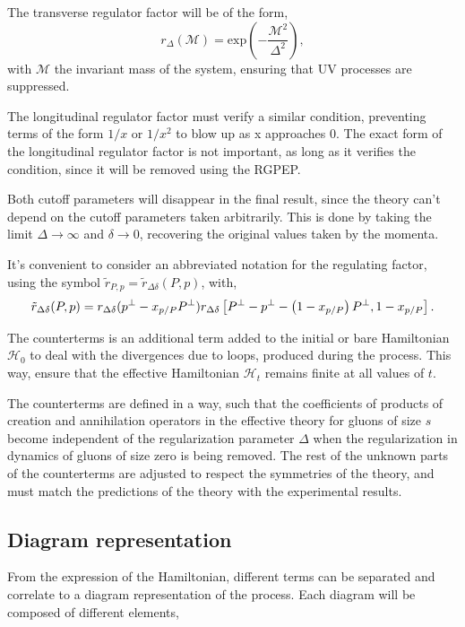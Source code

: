 \documentclass[11pt,a4paper,twoside,pdf]{article}
\numberwithin{equation}{section}
\begin{document}
The transverse regulator factor will be of the form, 
\begin{equation}
    r_\Delta (\mathcal{M}) = \text{exp} \left( -\frac{\mathcal{M}^2}{\Delta^2} \right),
\end{equation}
with $\mathcal{M}$ the invariant mass of the system, ensuring that UV processes are
suppressed.

The longitudinal regulator factor must verify a similar condition, preventing terms
of the form $1/x$ or $1/x^2$ to blow up as x approaches 0. The exact form of the 
longitudinal regulator factor is not important, as long as it verifies the condition, 
since it will be removed using the RGPEP.

Both cutoff parameters will disappear in the final result, since the theory can't
depend on the cutoff parameters taken arbitrarily. This is done by taking the
limit $\Delta \to \infty$ and $\delta \to 0$, recovering the original values
taken by the momenta.

It's convenient to consider an abbreviated notation for the regulating factor, 
using the symbol $\tilde{r}_{P, p} = \tilde{r}_{\Delta \delta} (P,p)$, with,
\begin{equation}
    \tilde{r}_{\Delta \delta} (P,p) = r_{\Delta \delta} (p^\perp - x_{p/P}P^\perp) 
    r_{\Delta \delta}\left[ P^\perp-p^\perp-\left( 1-x_{p/P} \right)P^\perp, 1-x_{p/P} \right].
\end{equation}

The counterterms is an additional term added to the initial or bare Hamiltonian 
$\mathcal{H}_0$ to deal with the divergences due to loops, produced during the 
process. This way, ensure that the effective Hamiltonian $\mathcal{H}_t$ remains 
finite at all values of $t$.

The counterterms are defined in a way, such that the coefficients of products 
of creation and annihilation operators in the effective theory for gluons of size $s$
become independent of the regularization parameter $\Delta$ when the regularization
in dynamics of gluons of size zero is being removed. The rest of the unknown parts 
of the counterterms are adjusted to respect the symmetries of the theory, and must 
match the predictions of the theory with the experimental results.

\subsection{Diagram representation}

From the expression of the Hamiltonian, different terms can be separated and correlate
to a diagram representation of the process. Each diagram will be composed of different elements, 
\end{document}

